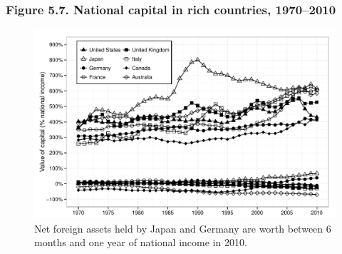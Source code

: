 \documentclass[t]{beamer}\usepackage[]{graphicx}\usepackage[]{color}
\newenvironment{knitrout}{}{} %
\begin{document}
\begin{frame}[label=Figure_5_7]
\frametitle{Figure 5.7. National capital in rich countries, 1970--2010}
\begin{figure}[t]
\begin{minipage}[b]{\textwidth}
\centering
\begin{knitrout}\footnotesize
{}\color{fgcolor}

{\centering \includegraphics[width=1\linewidth]{figures/bw/Figure_5_7} 

}



\end{knitrout}
\caption{Net foreign assets held by Japan and Germany are worth between 6 months and one year of national income in 2010.}
\end{minipage}
\end{figure}
\end{frame}
\end{document}
